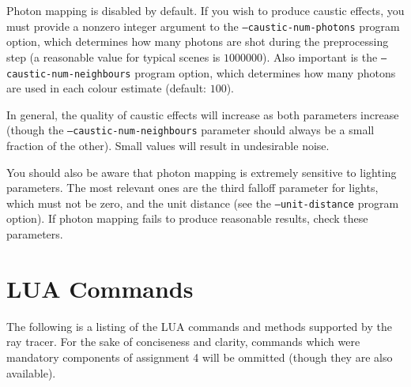 \documentclass{article}
\begin{document}
Photon mapping is disabled by default. If you wish to produce caustic effects,
you must provide a nonzero integer argument to the {\tt --caustic-num-photons}
program option, which determines how many photons are shot during the
preprocessing step (a reasonable value for typical scenes is $1000000$). Also
important is the {\tt --caustic-num-neighbours} program option, which determines
how many photons are used in each colour estimate (default: $100$).

In general, the quality of caustic effects will increase as both parameters
increase (though the {\tt --caustic-num-neighbours} parameter should always be a
small fraction of the other). Small values will result in undesirable noise.

You should also be aware that photon mapping is extremely sensitive to lighting
parameters. The most relevant ones are the third falloff parameter for lights,
which must not be zero, and the unit distance (see the {\tt --unit-distance} program
option). If photon mapping fails to produce reasonable results, check these
parameters.

\section{LUA Commands}
\label{lua_commands}

The following is a listing of the LUA commands and methods supported by the ray
tracer. For the sake of conciseness and clarity, commands which were mandatory
components of assignment 4 will be ommitted (though they are also available).
\end{document}
